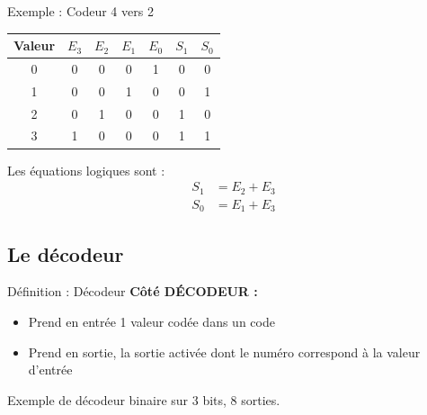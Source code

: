 \documentclass[a4paper,12pt]{article}
\begin{document}
\begin{examplebox}{Exemple : Codeur 4 vers 2}
\begin{center}
\begin{tabular}{|c|cccc|cc|}
\hline
\textbf{Valeur} & $E_3$ & $E_2$ & $E_1$ & $E_0$ & $S_1$ & $S_0$ \\
\hline
0 & 0 & 0 & 0 & 1 & 0 & 0 \\
1 & 0 & 0 & 1 & 0 & 0 & 1 \\
2 & 0 & 1 & 0 & 0 & 1 & 0 \\
3 & 1 & 0 & 0 & 0 & 1 & 1 \\
\hline
\end{tabular}
\end{center}

Les équations logiques sont :
\begin{align*}
S_1 &= E_2 + E_3 \\
S_0 &= E_1 + E_3
\end{align*}
\end{examplebox}

\subsection{Le décodeur}

\begin{defbox}{Définition : Décodeur}
\textbf{Côté DÉCODEUR :}
\begin{itemize}
    \item Prend en entrée 1 valeur codée dans un code
    \item Prend en sortie, la sortie activée dont le numéro correspond à la valeur d'entrée
\end{itemize}

Exemple de décodeur binaire sur 3 bits, 8 sorties.
\end{defbox}
\end{document}

